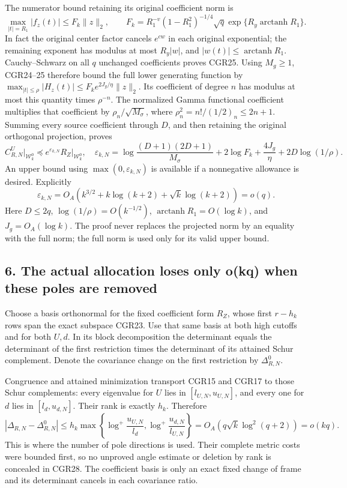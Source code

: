 \documentclass[11pt]{article}
\begin{document}
The numerator bound retaining its original coefficient norm is \[
\max_{|t|=R_1}|f_z(t)|
\le F_k\|z\|_2,\qquad
F_k=R_1^{-v}(1-R_1^2)^{-1/4}\sqrt q
\exp\{R_y\operatorname{arctanh}R_1\}.
\tag{CGR25}
\] In fact the original center factor cancels \(e^{cw}\) in each original exponential; the remaining exponent has modulus at most \(R_y|w|\), and \(|w(t)|\le\operatorname{arctanh}R_1\). Cauchy--Schwarz on all \(q\) unchanged coefficients proves CGR25. Using \(M_g\ge1\), CGR24--25 therefore bound the full lower generating function by \(\max_{|t|\le\rho}|H_z(t)|\le F_ke^{2J_g/\eta}\|z\|_2\). Its coefficient of degree \(n\) has modulus at most this quantity times \(\rho^{-n}\). The normalized Gamma functional coefficient multiplies that coefficient by \(\rho_n/\sqrt{M_\sigma}\), where \(\rho_n^2=n!/(1/2)_n\le2n+1\). Summing every source coefficient through \(D\), and then retaining the original orthogonal projection, proves \[
\boxed{C_{R,N}^U\big|_{\mathcal W_k^0}
\preceq e^{\varepsilon_{k,N}}R_Z\big|_{\mathcal W_k^0},}
\quad
\varepsilon_{k,N}=
\log\frac{(D+1)(2D+1)}{M_\sigma}+2\log F_k
+\frac{4J_g}{\eta}+2D\log(1/\rho).
\tag{CGR26}
\] An upper bound using \(\max(0,\varepsilon_{k,N})\) is available if a nonnegative allowance is desired. Explicitly \[
\varepsilon_{k,N}
=O_A(k^{3/2}+k\log(k+2)+\sqrt{k}\log(k+2))=o(q).
\tag{CGR27}
\] Here \(D\le2q\), \(\log(1/\rho)=O(k^{-1/2})\), \(\operatorname{arctanh}R_1=O(\log k)\), and \(J_g=O_A(\log k)\). The proof never replaces the projected norm by an equality with the full norm; the full norm is used only for its valid upper bound.

\subsection{6. The actual allocation loses only o(kq) when these poles are removed}\label{the-actual-allocation-loses-only-okq-when-these-poles-are-removed}

Choose a basis orthonormal for the fixed coefficient form \(R_Z\), whose first \(r-h_k\) rows span the exact subspace CGR23. Use that same basis at both high cutoffs and for both \(U,d\). In its block decomposition the determinant equals the determinant of the first restriction times the determinant of its attained Schur complement. Denote the covariance change on the first restriction by \(\Delta_{R,N}^0\).

Congruence and attained minimization transport CGR15 and CGR17 to those Schur complements: every eigenvalue for \(U\) lies in \([l_{U,N},u_{U,N}]\), and every one for \(d\) lies in \([l_d,u_{d,N}]\). Their rank is exactly \(h_k\). Therefore \[
\boxed{|\Delta_{R,N}-\Delta_{R,N}^0|
\le h_k\max\left\{
\log^+\frac{u_{U,N}}{l_d},
\log^+\frac{u_{d,N}}{l_{U,N}}\right\}
=O_A(q\sqrt{k}\log^2(q+2))=o(kq).}
\tag{CGR28}
\] This is where the number of pole directions is used. Their complete metric costs were bounded first, so no unproved angle estimate or deletion by rank is concealed in CGR28. The coefficient basis is only an exact fixed change of frame and its determinant cancels in each covariance ratio.
\end{document}
